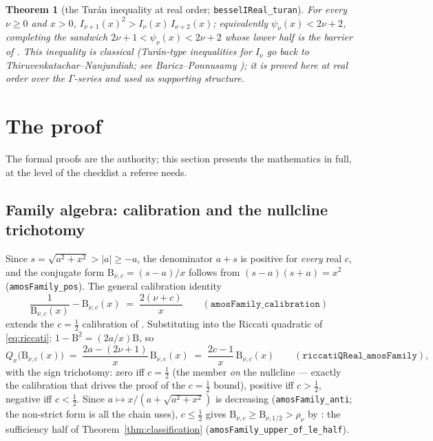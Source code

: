 \documentclass[11pt]{article}
\newtheorem{theorem}{Theorem}[section]
\newcommand{\lean}[1]{\texttt{#1}}
\newcommand{\Bfam}{\mathrm{B}}
\begin{document}
\begin{theorem}[the Tur\'an inequality at real order;
\lean{besselIReal\_turan}]\label{thm:turan}
For every $\nu \ge 0$ and $x > 0$,
$I_{\nu+1}(x)^2 > I_\nu(x)\, I_{\nu+2}(x)$; equivalently
$\psi_\nu(x) < 2\nu+2$, completing the sandwich
$2\nu+1 < \psi_\nu(x) < 2\nu+2$ whose lower half is the barrier of
\cite{ErikssonC4}.  This inequality is classical (Tur\'an-type
inequalities for $I_\nu$ go back to Thiruvenkatachar--Nanjundiah;
see Baricz--Ponnusamy \cite{BP13}); it is proved here at real order
over the $\Gamma$-series and used as supporting structure.
\end{theorem}

\section{The proof}\label{sec:proof}

The formal proofs are the authority; this section presents the
mathematics in full, at the level of the checklist a referee needs.

\subsection{Family algebra: calibration and the nullcline
trichotomy}\label{sec:family}

Since $s = \sqrt{a^2+x^2} > |a| \ge -a$, the denominator $a+s$ is
positive for \emph{every} real $c$, and the conjugate form
$\Bfam_{\nu,c} = (s-a)/x$ follows from $(s-a)(s+a) = x^2$
(\lean{amosFamily\_pos}).  The general calibration identity
\begin{equation}\label{eq:calibration}
\frac{1}{\Bfam_{\nu,c}(x)} - \Bfam_{\nu,c}(x) \;=\;
\frac{2(\nu+c)}{x}
\qquad (\lean{amosFamily\_calibration})
\end{equation}
extends the $c = \tfrac12$ calibration of \cite{ErikssonC4}.
Substituting into the Riccati quadratic of \eqref{eq:riccati}:
$1 - \Bfam^2 = (2a/x)\Bfam$, so
\begin{equation}\label{eq:nullcline}
Q_x\bigl(\Bfam_{\nu,c}(x)\bigr) \;=\;
\frac{2a - (2\nu+1)}{x}\,\Bfam_{\nu,c}(x) \;=\;
\frac{2c-1}{x}\,\Bfam_{\nu,c}(x)
\qquad (\lean{riccatiQReal\_amosFamily}),
\end{equation}
with the sign trichotomy: zero iff $c = \tfrac12$ (the member
\emph{on} the nullcline --- exactly the calibration that drives the
proof of the $c=\tfrac12$ bound), positive iff $c > \tfrac12$,
negative iff $c < \tfrac12$.  Since
$a \mapsto x/(a+\sqrt{a^2+x^2})$ is decreasing
(\lean{amosFamily\_anti}; the non-strict form is all the chain
uses), $c \le \tfrac12$ gives
$\Bfam_{\nu,c} \ge \Bfam_{\nu,1/2} > \rho_\nu$ by
\cite{ErikssonC4}: the sufficiency half of
Theorem~\ref{thm:classification}
(\lean{amosFamily\_upper\_of\_le\_half}).
\end{document}
